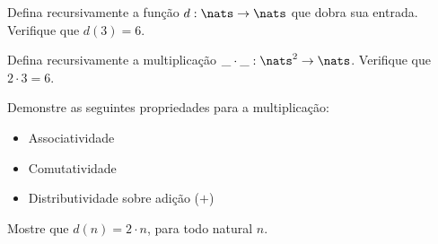 \begin{exercise}
Defina recursivamente a função $d : \nats \to \nats$ que dobra sua entrada. Verifique que $d(3) = 6$. 
\end{exercise}

\begin{exercise}
Defina recursivamente a multiplicação $\_\cdot\_: \nats^2 \to \nats$. Verifique que $2 \cdot 3 = 6$.
\end{exercise}

\begin{exercise}
Demonstre as seguintes propriedades para a multiplicação:
	\begin{itemize}
		\item Associatividade
		\item Comutatividade
		\item Distributividade sobre adição ($+$)
	\end{itemize}
\end{exercise}

\begin{exercise}
Mostre que $d(n) = 2 \cdot n$, para todo natural $n$.
\end{exercise}